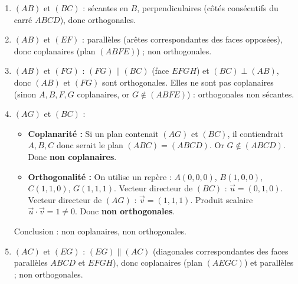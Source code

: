 \documentclass[11pt]{article}
\begin{document}
\begin{corrige}
\begin{enumerate}
\item $(AB)$ et $(BC)$ : sécantes en $B$, perpendiculaires (côtés consécutifs du carré $ABCD$), donc orthogonales.
\item $(AB)$ et $(EF)$ : parallèles (arêtes correspondantes des faces opposées), donc coplanaires (plan $(ABFE)$) ; non orthogonales.
\item $(AB)$ et $(FG)$ : $(FG) \parallel (BC)$ (face $EFGH$) et $(BC) \perp (AB)$, donc $(AB)$ et $(FG)$ sont orthogonales. Elles ne sont pas coplanaires (sinon $A, B, F, G$ coplanaires, or $G \notin (ABFE)$) : orthogonales non sécantes.
\item $(AG)$ et $(BC)$ : 
  \begin{itemize}
  \item \textbf{Coplanarité :} Si un plan contenait $(AG)$ et $(BC)$, il contiendrait $A, B, C$ donc serait le plan $(ABC) = (ABCD)$. Or $G \notin (ABCD)$. Donc \textbf{non coplanaires}.
  \item \textbf{Orthogonalité :} On utilise un repère : $A(0,0,0)$, $B(1,0,0)$, $C(1,1,0)$, $G(1,1,1)$. Vecteur directeur de $(BC)$ : $\vec{u}=(0,1,0)$. Vecteur directeur de $(AG)$ : $\vec{v}=(1,1,1)$. Produit scalaire $\vec{u}\cdot\vec{v}=1 \neq 0$. Donc \textbf{non orthogonales}.
  \end{itemize}
  Conclusion : non coplanaires, non orthogonales.
\item $(AC)$ et $(EG)$ : $(EG) \parallel (AC)$ (diagonales correspondantes des faces parallèles $ABCD$ et $EFGH$), donc coplanaires (plan $(AEGC)$) et parallèles ; non orthogonales.
\end{enumerate}
\end{corrige}
\end{document}
